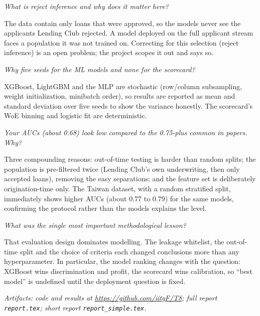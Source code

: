 \documentclass[a4paper,11pt]{article}
\newenvironment{qa}{\begin{description}[leftmargin=0pt,itemsep=6pt]}{\end{description}}
\newcommand{\Q}[1]{\item[Q.] \textit{#1}}
\newcommand{\A}{\item[A.]}
\begin{document}
\begin{qa}
\Q{What is reject inference and why does it matter here?}
\A The data contain only loans that were approved, so the models never see the applicants Lending Club rejected. A model deployed on the full applicant stream faces a population it was not trained on. Correcting for this selection (reject inference) is an open problem; the project scopes it out and says so.

\Q{Why five seeds for the ML models and none for the scorecard?}
\A XGBoost, LightGBM and the MLP are stochastic (row/column subsampling, weight initialization, minibatch order), so results are reported as mean and standard deviation over five seeds to show the variance honestly. The scorecard's WoE binning and logistic fit are deterministic.

\Q{Your AUCs (about 0.68) look low compared to the 0.75-plus common in papers. Why?}
\A Three compounding reasons: out-of-time testing is harder than random splits; the population is pre-filtered twice (Lending Club's own underwriting, then only accepted loans), removing the easy separations; and the feature set is deliberately origination-time only. The Taiwan dataset, with a random stratified split, immediately shows higher AUCs (about 0.77 to 0.79) for the same models, confirming the protocol rather than the models explains the level.

\Q{What was the single most important methodological lesson?}
\A That evaluation design dominates modelling. The leakage whitelist, the out-of-time split and the choice of criteria each changed conclusions more than any hyperparameter. In particular, the model ranking changes with the question: XGBoost wins discrimination and profit, the scorecard wins calibration, so ``best model'' is undefined until the deployment question is fixed.
\end{qa}

\vspace{4mm}
\noindent\textit{Artifacts: code and results at \url{https://github.com/iitgF/T8}; full report \texttt{report.tex}; short report \texttt{report\_simple.tex}.}
\end{document}
